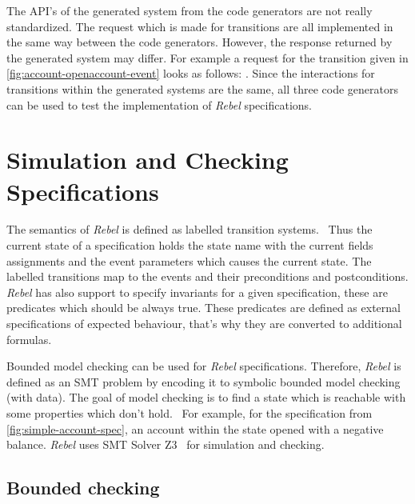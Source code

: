 The API's of the generated system from the code generators are not really standardized. The request which is made for transitions are all implemented in the same way between the code generators. However, the response returned by the generated system may differ. For example a request for the transition given in \autoref{fig:account-openaccount-event} looks as follows: . Since the interactions for transitions within the generated systems are the same, all three code generators can be used to test the implementation of \textit{Rebel} specifications.

\section{Simulation and Checking Specifications}


The semantics of \textit{Rebel} is defined as labelled transition systems.~\cite[p.~5]{stoel_storm_vinju_bosman_2016} Thus the current state of a specification holds the state name with the current fields assignments and the event parameters which causes the current state. The labelled transitions map to the events and their preconditions and postconditions. \textit{Rebel} has also support to specify invariants for a given specification, these are predicates which should be always true. These predicates are defined as external specifications of expected behaviour, that's why they are converted to additional formulas. 


Bounded model checking can be used for \textit{Rebel} specifications. Therefore, \textit{Rebel} is defined as an SMT problem by encoding it to symbolic bounded model checking (with data). The goal of model checking is to find a state which is reachable with some properties which don't hold.~\cite[p.~5]{stoel_storm_vinju_bosman_2016} For example, for the specification from \autoref{fig:simple-account-spec}, an account within the state opened with a negative balance. \textit{Rebel} uses SMT Solver Z3~\cite{moura_bjorner_2008} for simulation and checking.

\subsection{Bounded checking}

